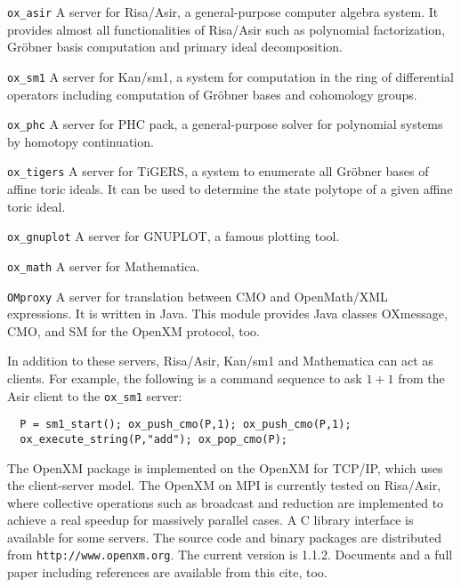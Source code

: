 \documentclass[notitlepage]{book}
\begin{document}
\begin{description}
\item{\tt ox\_asir}
A server for Risa/Asir, a general-purpose computer algebra
system. It provides almost
all functionalities of Risa/Asir such as polynomial factorization,
Gr\"obner basis computation and primary ideal decomposition.
\item{\tt ox\_sm1}
A server for Kan/sm1, a system for computation in 
the ring of differential operators including computation of Gr\"obner bases
and cohomology groups.
\item {\tt ox\_phc}
A server for PHC pack, a general-purpose solver for
polynomial systems by homotopy continuation. 
\item {\tt ox\_tigers}
A server for TiGERS, a system to enumerate
all Gr\"obner bases of affine toric ideals.
It can be used to determine the state polytope
of a given affine toric ideal.
\item {\tt ox\_gnuplot}
A server for GNUPLOT, a famous plotting tool.
\item {\tt ox\_math}
A server for Mathematica.
\item {\tt OMproxy}
A server for translation between CMO and OpenMath/XML expressions.
It is written in Java.
This module provides Java classes OXmessage, CMO, and SM
for the OpenXM protocol, too.
\end{description}
In addition to these servers, Risa/Asir, Kan/sm1 and Mathematica
can act as clients. 
For example, the following is a command sequence to ask $1+1$ from
the Asir client to the {\tt ox\_sm1} server:
\begin{verbatim}
  P = sm1_start(); ox_push_cmo(P,1); ox_push_cmo(P,1);
  ox_execute_string(P,"add"); ox_pop_cmo(P);
\end{verbatim}
The OpenXM package is implemented on the  OpenXM for TCP/IP, 
which uses the client-server model.
The OpenXM on MPI is currently tested on Risa/Asir,
where collective operations such as broadcast and reduction
are implemented to achieve a real speedup for massively parallel cases.
A C library interface is available for some servers.
The source code and binary packages are distributed from
{\tt http://www.openxm.org}.
The current version is 1.1.2.
Documents and a full paper including references are available
from this cite, too.
\end{document}

